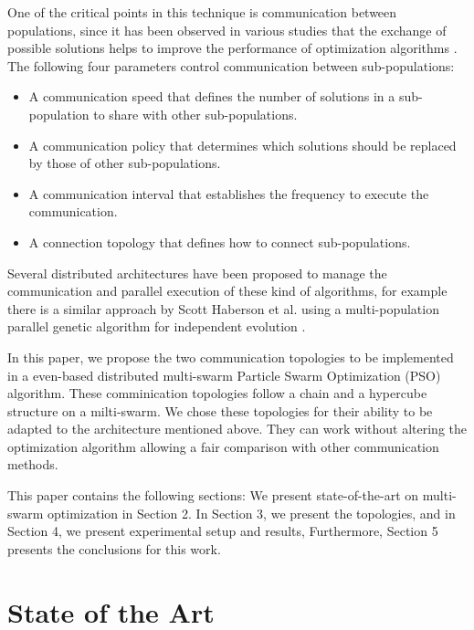 \documentclass[runningheads]{llncs}
\begin{document}
One of the critical points in this technique is communication between
populations, since it has been observed in various studies that the
exchange of possible solutions helps to improve the performance of
optimization algorithms \cite{a2}. The following four parameters
control communication between sub-populations:

\begin{itemize}
    \item A communication speed that defines the number of solutions in a sub-population to share with other sub-populations.
    \item A communication policy that determines which solutions should be replaced by those of other sub-populations.
    \item A communication interval that establishes the frequency to execute the communication.
    \item A connection topology that defines how to connect sub-populations.
\end{itemize}

Several distributed architectures have been proposed to manage the communication
and parallel execution of these kind of algorithms, for example there is a
similar approach by Scott Haberson et al. using a multi-population parallel
genetic algorithm for independent evolution \cite{da1}. 

In this paper, we propose the two communication topologies to be implemented in a 
even-based distributed multi-swarm Particle Swarm Optimization (PSO) algorithm.
These comminication topologies follow a chain and a hypercube structure on a milti-swarm. We chose
these topologies for their ability to be adapted to the architecture
mentioned above. They can work without altering the optimization
algorithm allowing a fair comparison with other communication
methods. 

This paper contains the following sections: We present state-of-the-art on
multi-swarm optimization in Section 2. In Section 3, we present the topologies,
and in Section 4, we present experimental setup and results, Furthermore,
Section 5 presents the conclusions for this work.

\section{State of the Art}
\end{document}
